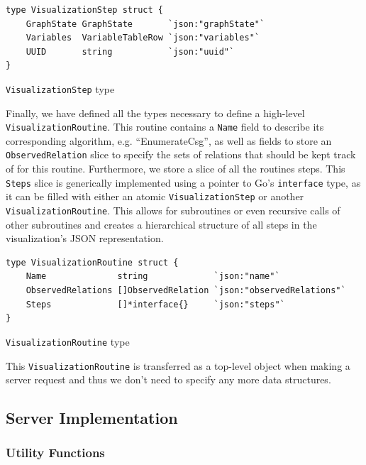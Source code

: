 \begin{code}
\begin{verbatim}
type VisualizationStep struct {
    GraphState GraphState       `json:"graphState"`
    Variables  VariableTableRow `json:"variables"`
    UUID       string           `json:"uuid"`
}
\end{verbatim}
\caption{\texttt{VisualizationStep} type}
\end{code}
\vspace{0.8cm}

Finally, we have defined all the types necessary to define a high-level \texttt{VisualizationRoutine}. This routine contains a \texttt{Name} field to describe its corresponding algorithm, e.g. ``EnumerateCsg'', as well as fields to store an \texttt{ObservedRelation} slice to specify the sets of relations that should be kept track of for this routine. Furthermore, we store a slice of all the routines steps. This \texttt{Steps} slice is generically implemented using a pointer to Go's \texttt{interface{}} type, as it can be filled with either an atomic \texttt{VisualizationStep} or another \texttt{VisualizationRoutine}. This allows for subroutines or even recursive calls of other subroutines and creates a hierarchical structure of all steps in the visualization's JSON representation. 

\begin{code}
\begin{verbatim}
type VisualizationRoutine struct {
    Name              string             `json:"name"`
    ObservedRelations []ObservedRelation `json:"observedRelations"`
    Steps             []*interface{}     `json:"steps"`
}
\end{verbatim}
\caption{\texttt{VisualizationRoutine} type}
\end{code}
\label{datastructure:visualization-routine}
\vspace{0.8cm}

This \texttt{VisualizationRoutine} is transferred as a top-level object when making a server request and thus we don't need to specify any more data structures.

\subsection{Server Implementation}

\subsubsection{Utility Functions}

